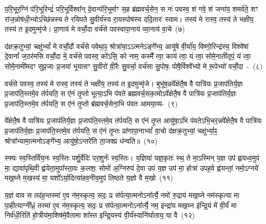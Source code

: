 {\anuvakamend[{अप॑श्यन्तो\-ऽग्नीषो॒मीय॑मा॒त्मना॒ परा॒ त्रीणि॑ च}]}%

प॒रि॒भूर॒ग्निं प॑रि॒भूरिन्द्रं॑ परि॒भूर्विश्वा᳚न् दे॒वान्प॑रि॒भूर्माꣳ स॒ह ब्र॑ह्मवर्च॒सेन॒ स नः॑ पवस्व॒ शं गवे॒ शं जना॑य॒ शमर्व॑ते॒ शꣳ रा॑ज॒न्नोष॑धी॒भ्यो\-ऽच्छि॑न्नस्य ते रयिपते सु॒वीर्य॑स्य रा॒यस्पोष॑स्य ददि॒तारः॑ स्याम। तस्य॑ मे रास्व॒ तस्य॑ ते भक्षीय॒ तस्य॑ त इ॒दमुन्मृ॑जे। प्रा॒णाय॑ मे वर्चो॒दा वर्च॑से पवस्वापा॒नाय॑ व्या॒नाय॑ वा॒चे~(७)

द॑क्षक्र॒तुभ्यां॒ चक्षु॑र्भ्यां मे वर्चो॒दौ वर्च॑से पवेथा॒ꣴ॒ श्रोत्रा॑या॒\-ऽऽ\-\-त्मने\-ऽङ्गे᳚भ्य॒ आयु॑षे वी॒र्या॑य॒ विष्णो॒रिन्द्र॑स्य॒ विश्वे॑षां दे॒वानां᳚ ज॒ठर॑मसि वर्चो॒दा मे॒ वर्च॑से पवस्व॒ को॑\-ऽसि॒ को नाम॒ कस्मै᳚ त्वा॒ काय॑ त्वा॒ यं त्वा॒ सोमे॒नाती॑तृपं॒ यं त्वा॒ सोमे॒नामी॑मदꣳ सुप्र॒जाः प्र॒जया॑ भूयासꣳ सु॒वीरो॑ वी॒रैः सु॒वर्चा॒ वर्च॑सा सु॒पोषः॒ पोषै॒र्विश्वे᳚भ्यो मे रू॒पेभ्यो॑ वर्चो॒दा~-~(८)

वर्च॑से पवस्व॒ तस्य॑ मे रास्व॒ तस्य॑ ते भक्षीय॒ तस्य॑ त इ॒दमुन्मृ॑जे। बुभू॑ष॒न्नवे᳚क्षेतै॒ष वै पात्रि॑यः प्र॒जा\-प॑तिर्य॒ज्ञः प्र॒जा\-प॑ति॒स्तमे॒व त॑र्पयति॒ स ए॑नं तृ॒प्तो भूत्या॒\-ऽभि प॑वते ब्रह्मवर्च॒सका॒मो\-ऽवे᳚क्षेतै॒ष वै पात्रि॑यः प्र॒जा\-प॑तिर्य॒ज्ञः प्र॒जा\-प॑ति॒स्तमे॒व त॑र्पयति॒ स ए॑नं तृ॒प्तो ब्र॑ह्मवर्च॒सेना॒भि प॑वत आमया॒व्य-~(९)

वे᳚क्षेतै॒ष वै पात्रि॑यः प्र॒जा\-प॑तिर्य॒ज्ञः प्र॒जा\-प॑ति॒स्तमे॒व त॑र्पयति॒ स ए॑नं तृ॒प्त आयु॑षा॒\-ऽभि प॑वते\-ऽभि॒चर॒न्नवे᳚क्षेतै॒ष वै पात्रि॑यः प्र॒जा\-प॑तिर्य॒ज्ञः प्र॒जा\-प॑ति॒स्तमे॒व त॑र्पयति॒ स ए॑नं तृ॒प्तः प्रा॑णापा॒ना\-भ्यां᳚ वा॒चो द॑क्षक्र॒तुभ्यां॒ चक्षु॑र्भ्या॒ꣴ॒ श्रोत्रा᳚भ्यामा॒त्मनो\-ऽङ्गे᳚भ्य॒ आयु॑षो॒\-ऽन्तरे॑ति ता॒जक्प्र ध॑न्वति॥~(१०)

{\anuvakamend[{वा॒चे रू॒पेभ्यो॑ वर्चो॒दा आ॑मया॒वी पञ्च॑चत्वारिꣳशच्च}]}%

स्फ्यः स्व॒स्तिर्वि॑घ॒नः स्व॒स्तिः पर्\mbox{}शु॒र्वेदिः॑ पर॒शुर्नः॑ स्व॒स्तिः। य॒ज्ञिया॑ यज्ञ॒कृतः॑ स्थ॒ ते मा॒\-ऽस्मिन् य॒ज्ञ उप॑ ह्वयध्व॒मुप॑ मा॒ द्यावा॑पृथि॒वी ह्व॑येता॒मुपा᳚स्ता॒वः क॒लशः॒ सोमो॑ अ॒ग्निरुप॑ दे॒वा उप॑ य॒ज्ञ उप॑ मा॒ होत्रा॑ उपह॒वे ह्व॑यन्तां॒ नमो॒\-ऽग्नये॑ मख॒घ्ने म॒खस्य॑ मा॒ यशो᳚\-ऽर्या॒दित्या॑हव॒नीय॒मुप॑ तिष्ठते य॒ज्ञो वै म॒खो~(११)

य॒ज्ञं वाव स तद॑ह॒न्तस्मा॑ ए॒व न॑म॒स्कृत्य॒ सदः॒ प्र स॑र्पत्या॒त्मनो\-ऽना᳚र्त्यै॒ नमो॑ रु॒द्राय॑ मख॒घ्ने नम॑स्कृत्या मा पा॒हीत्याग्नी᳚ध्रं॒ तस्मा॑ ए॒व न॑म॒स्कृत्य॒ सदः॒ प्र स॑र्पत्या॒त्मनो\-ऽना᳚र्त्यै॒ नम॒ इन्द्रा॑य मख॒घ्न इ॑न्द्रि॒यं मे॑ वी॒र्यं॑ मा निर्व॑धी॒रिति॑ हो॒त्रीय॑मा॒शिष॑मे॒वैतामा शा᳚स्त इन्द्रि॒यस्य॑ वी॒र्य॑स्यानि॑र्घाताय॒ या वै~(१२)

